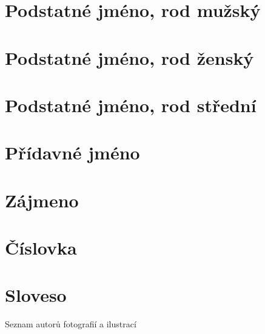\section{Podstatné jméno, rod mužský}            \label{sec:morpho_m}
%
\clearpage

\section{Podstatné jméno, rod ženský}            \label{sec:morpho_f}
%
\clearpage

\section{Podstatné jméno, rod střední}           \label{sec:morpho_n}
%
\clearpage

\section{Přídavné jméno}                         \label{sec:morpho_adj}
%
\clearpage

\section{Zájmeno}                                \label{sec:morpho_pron}
\clearpage

\section{Číslovka}                               \label{sec:morpho_num}
\clearpage

\section{Sloveso}                                \label{sec:morpho_v}
%

\fi


\ifmakebackmatter


\cleardoublepage
{}
  {Seznam autorů fotografií a ilustrací}         \label{sec:photo}
\printindex[figures]

